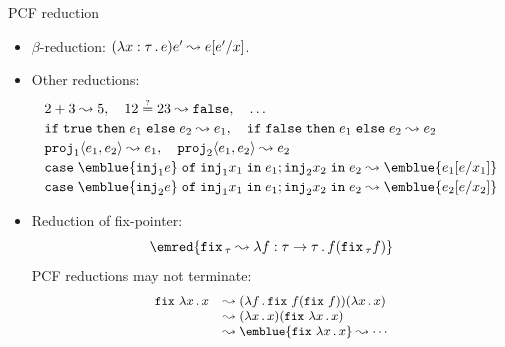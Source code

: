 \documentclass[paper=screen,mode=present,style=zysimple]{powerdot}
\begin{document}
\begin{slide}{PCF reduction}
\begin{itemize}
\item $\beta$-reduction: $(\lambda x : \tau \, . \, e) e' \leadsto e [e' / x]$.
\item Other reductions:
\[
\begin{array}{l}
2 + 3 \reduce 5, 
\quad 12 \eqtest 23 \reduce \cfalse ,
\quad \ldots
\\[0.2em]
\cif{\ctrue}{e_1}{e_2} \reduce e_1, 
\quad \cif{\cfalse}{e_1}{e_2} \reduce e_2
\\[0.2em]
\cproj_1 \cpair{e_1, e_2} \reduce e_1, 
\quad \cproj_2 \cpair{e_1, e_2} \reduce e_2
\\[0.2em]
\mathtt{case} \; \emblue{\cinj_1 e} \; \mathtt{of} \; \cinj_1 x_1 \; \mathtt{in} \; e_1 ; \cinj_2 x_2 \; \mathtt{in} \; e_2 
\reduce \emblue{e_1[e / x_1]}
\\[0.2em]
\mathtt{case} \; \emblue{\cinj_2 e} \; \mathtt{of} \; \cinj_1 x_1 \; \mathtt{in} \; e_1 ; \cinj_2 x_2 \; \mathtt{in} \; e_2 
\reduce \emblue{e_2[e / x_2]}
\end{array}
\vspace*{-1em}
\]
\item Reduction of fix-pointer: \vspace*{-0.5em}
$$\emred{\cfix_\tau \reduce \lambda f : \tau \to \tau \ldot f (\cfix_\tau f) } \vspace*{-0.5em}$$
PCF reductions may not terminate: \vspace*{-0.5em}
\[\small
\begin{array}{ll}
\cfix \, \lambda x \ldot x 
& \reduce (\lambda f \ldot \cfix \, f (\cfix \, f)) (\lambda x \ldot x) 
\\ & 
\reduce (\lambda x \ldot x) (\cfix \, \lambda x \ldot x)
\\ & 
\reduce \emblue{\cfix \, \lambda x \ldot x}
\reduce \cdots 
\end{array}
\]
\end{itemize}
\end{slide}
\end{document}
